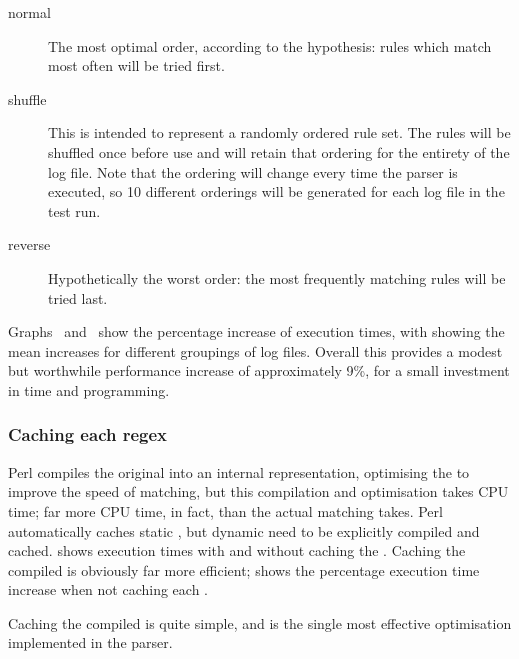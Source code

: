 \begin{description}

    \item [normal]  The most optimal order, according to the hypothesis:
        rules which match most often will be tried first.

    \item [shuffle] This is intended to represent a randomly ordered rule
        set.  The rules will be shuffled once before use and will retain
        that ordering for the entirety of the log file.  Note that the
        ordering will change every time the parser is executed, so 10
        different orderings will be generated for each log file in the test
        run.  

    \item [reverse] Hypothetically the worst order: the most frequently
        matching rules will be tried last.

\end{description}

Graphs~
and~ show the
percentage increase of execution times, with  showing the mean increases for
different groupings of log files.  Overall this provides a modest but
worthwhile performance increase of approximately 9\%, for a small
investment in time and programming.

\subsubsection{Caching each regex}

\label{Caching each regex}

Perl compiles the original \regex{} into an internal representation,
optimising the \regex{} to improve the speed of matching, but this
compilation and optimisation takes CPU time; far more CPU time, in fact,
than the actual matching takes.  Perl automatically caches static
\regexes{}, but dynamic \regexes{} need to be explicitly compiled and
cached.   shows execution
times with and without caching the \regex{}.  Caching the compiled
\regexes{} is obviously far more efficient;  shows the percentage execution time increase
when not caching each \regex{}.

Caching the compiled \regexes{} is quite simple, and is the single most
effective optimisation implemented in the parser.

